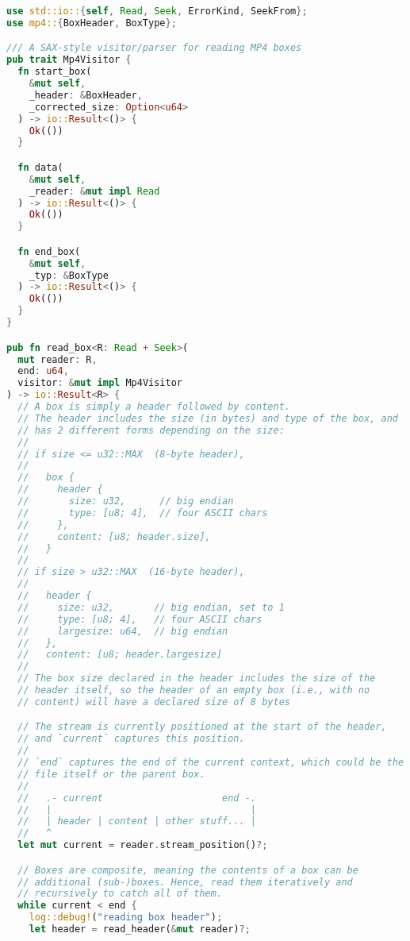 \begin{lstlisting}[language=Rust]
use std::io::{self, Read, Seek, ErrorKind, SeekFrom};
use mp4::{BoxHeader, BoxType};

/// A SAX-style visitor/parser for reading MP4 boxes
pub trait Mp4Visitor {
  fn start_box(
    &mut self,
    _header: &BoxHeader,
    _corrected_size: Option<u64>
  ) -> io::Result<()> {
    Ok(())
  }

  fn data(
    &mut self,
    _reader: &mut impl Read
  ) -> io::Result<()> {
    Ok(())
  }

  fn end_box(
    &mut self,
    _typ: &BoxType
  ) -> io::Result<()> {
    Ok(())
  }
}

pub fn read_box<R: Read + Seek>(
  mut reader: R,
  end: u64,
  visitor: &mut impl Mp4Visitor
) -> io::Result<R> {
  // A box is simply a header followed by content.
  // The header includes the size (in bytes) and type of the box, and
  // has 2 different forms depending on the size:
  //
  // if size <= u32::MAX  (8-byte header),
  //
  //   box {
  //     header {
  //       size: u32,      // big endian
  //       type: [u8; 4],  // four ASCII chars
  //     },
  //     content: [u8; header.size],
  //   }
  //
  // if size > u32::MAX  (16-byte header),
  //
  //   header {
  //     size: u32,       // big endian, set to 1
  //     type: [u8; 4],   // four ASCII chars
  //     largesize: u64,  // big endian
  //   },
  //   content: [u8; header.largesize]
  //
  // The box size declared in the header includes the size of the
  // header itself, so the header of an empty box (i.e., with no
  // content) will have a declared size of 8 bytes

  // The stream is currently positioned at the start of the header,
  // and `current` captures this position.
  //
  // `end` captures the end of the current context, which could be the
  // file itself or the parent box.
  //
  //   .- current                     end -.
  //   |                                   |
  //   | header | content | other stuff... |
  //   ^
  let mut current = reader.stream_position()?;

  // Boxes are composite, meaning the contents of a box can be
  // additional (sub-)boxes. Hence, read them iteratively and
  // recursively to catch all of them.
  while current < end {
    log::debug!("reading box header");
    let header = read_header(&mut reader)?;


\end{lstlisting}
